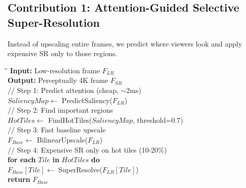 \documentclass[11pt, a4paper]{article}
\begin{document}
\subsection{Contribution 1: Attention-Guided Selective Super-Resolution}

Instead of upscaling entire frames, we predict where viewers look and apply expensive SR only to those regions.

\begin{algorithmbox}
\begin{tabbing}
\hspace{0.5cm}\=\hspace{0.5cm}\=\hspace{0.5cm}\=\kill
\textbf{Input:} Low-resolution frame $F_{LR}$ \\
\textbf{Output:} Perceptually 4K frame $F_{SR}$ \\[0.3em]
\textcolor{secondarygreen}{// Step 1: Predict attention (cheap, $\sim$2ms)} \\
\> $SaliencyMap \leftarrow$ PredictSaliency($F_{LR}$) \\
\textcolor{secondarygreen}{// Step 2: Find important regions} \\
\> $HotTiles \leftarrow$ FindHotTiles($SaliencyMap$, threshold=0.7) \\
\textcolor{secondarygreen}{// Step 3: Fast baseline upscale} \\
\> $F_{Base} \leftarrow$ BilinearUpscale($F_{LR}$) \\
\textcolor{secondarygreen}{// Step 4: Expensive SR only on hot tiles (10-20\%)} \\
\> \textbf{for each} $Tile$ \textbf{in} $HotTiles$ \textbf{do} \\
\>\> $F_{Base}[Tile] \leftarrow$ SuperResolve($F_{LR}[Tile]$) \\
\> \textbf{return} $F_{Base}$
\end{tabbing}
\end{algorithmbox}
\end{document}
